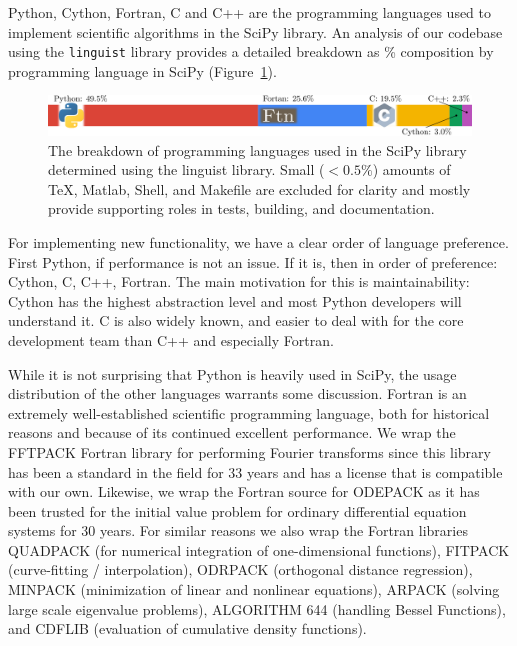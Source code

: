 \documentclass[fleqn,10pt]{wlscirep}
\begin{document}
Python, Cython, Fortran, C and C++ are the programming languages used to
implement scientific algorithms in the SciPy library. An analysis of our
codebase using the \texttt{linguist} library\cite{linguistref} provides a 
detailed breakdown as \% composition by programming language in 
SciPy (Figure~\ref{fig:linguist}).

\begin{figure}[H]
    \centering
		\includegraphics[width=\textwidth]{static/composition}
    \caption{The breakdown of programming languages used in the
             SciPy library determined using the linguist library.
    	 Small ($<0.5 \%$) amounts of TeX, Matlab, Shell,
    	 and Makefile are excluded for clarity and mostly
    	 provide supporting roles in tests, building, and
    	 documentation.}
    \label{fig:linguist}
\end{figure}

For implementing new functionality, we have a clear order of language
preference.  First Python, if performance is not an issue. If it is, then in
order of preference: Cython, C, C++, Fortran. The main motivation for this is
maintainability: Cython has the highest abstraction level and most Python
developers will understand it. C is also widely known, and easier to deal with
for the core development team than C++ and especially Fortran.

While it is not surprising that Python is heavily used in SciPy, the usage
distribution of the other languages warrants some discussion. Fortran is an
extremely well-established scientific programming language, both for historical
reasons and because of its continued excellent
performance\cite{Koelbel:1993:HPF:562354}. We wrap the FFTPACK Fortran library
for performing Fourier transforms\cite{SWARZTRAUBER198445, SWARZTRAUBER198251}
since this library has been a standard in the field for 33 years and has a
license that is compatible with our own. Likewise, we wrap the Fortran source
for ODEPACK\cite{citeulike:2644528} as it has been  trusted for the initial
value problem for ordinary differential equation systems for 30 years. For
similar reasons we also wrap the Fortran libraries
QUADPACK\cite{1983qspa.book.....P} (for numerical integration of
one-dimensional functions), FITPACK\cite{Dierckx:1993:CSF:151103}
(curve-fitting / interpolation), ODRPACK\cite{ODRPACK_Boggs} (orthogonal
distance regression), MINPACK\cite{osti_6997568} (minimization of linear and
nonlinear equations), ARPACK\cite{leh:sor:yan96} (solving large scale
eigenvalue problems), ALGORITHM 644\cite{Amos:1986:APP:7921.214331} (handling
Bessel Functions), and CDFLIB\cite{CDFLIB_site} (evaluation of cumulative
density functions).
\end{document}
